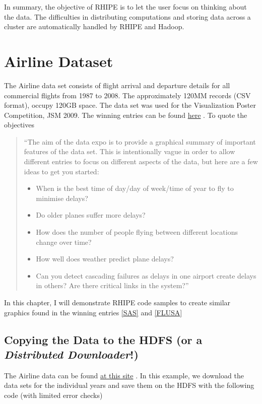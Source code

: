 \documentclass[letterpaper,10pt,english]{sphinxmanual}
\begin{document}
In summary, the objective of RHIPE is to let the user focus on thinking about
the data. The difficulties in distributing computations and storing data across
a cluster are automatically handled by RHIPE and Hadoop.


\chapter{Airline Dataset}
\label{airline:airline-dataset}\label{airline::doc}
The Airline data set consists of flight arrival and departure details for all
commercial flights from 1987 to 2008. The approximately 120MM records (CSV format),  occupy
120GB space. The data set was used for the Visualization Poster Competition, JSM
2009. The winning entries can be found \href{http://stat-computing.org/dataexpo/2009/}{here} .
To quote the objectives
\begin{quote}

``The aim of the data expo is to provide a graphical summary of important
features of the data set. This is intentionally vague in order to allow
different entries to focus on different aspects of the data, but here are a
few ideas to get you started:
\begin{itemize}
\item {} 
When is the best time of day/day of week/time of year to fly to minimise delays?

\item {} 
Do older planes suffer more delays?

\item {} 
How does the number of people flying between different locations change over time?

\item {} 
How well does weather predict plane delays?

\item {} 
Can you detect cascading failures as delays in one airport create delays in
others? Are there critical links in the system?''

\end{itemize}
\end{quote}

In this chapter, I will demonstrate RHIPE code samples to create similar
graphics found in the winning entries {\hyperref[airline:sas]{{[}SAS{]}}} and {\hyperref[airline:flusa]{{[}FLUSA{]}}}


\section{Copying the Data to the HDFS (or a \emph{Distributed Downloader}!)}
\label{airline:copying-the-data-to-the-hdfs-or-a-distributed-downloader}\label{airline:downloading-airline-data}
The Airline data can be found \href{http://stat-computing.org/dataexpo/2009/the-data.html}{at this site} .
In this example, we download the data sets for the individual years and save
them on the HDFS with the following code (with limited error checks)
\end{document}
